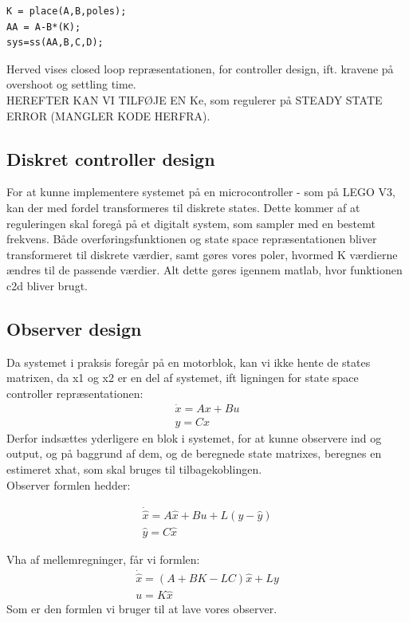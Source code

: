 \begin{lstlisting}
K = place(A,B,poles);
AA = A-B*(K);
sys=ss(AA,B,C,D);
\end{lstlisting}

Herved vises closed loop repræsentationen, for controller design, ift. kravene på overshoot og settling time.\\


HEREFTER KAN VI TILFØJE EN Ke, som regulerer på STEADY STATE ERROR (MANGLER KODE HERFRA). 

\subsection{Diskret controller design}
For at kunne implementere systemet på en microcontroller - som på LEGO V3, kan der med fordel transformeres til diskrete states. Dette kommer af at reguleringen skal foregå på et digitalt system, som sampler med en bestemt frekvens. 
Både overføringsfunktionen og state space repræsentationen bliver transformeret til diskrete værdier, samt gøres vores poler, hvormed K værdierne ændres til de passende værdier. Alt dette gøres igennem matlab, hvor funktionen c2d bliver brugt. 

\subsection{Observer design}
Da systemet i praksis foregår på en motorblok, kan vi ikke hente de states matrixen, da x1 og x2 er en del  af systemet, ift ligningen for state space controller repræsentationen: 
\begin{gather}
  \dot{x}=Ax+Bu \\
  y=Cx
\end{gather}
Derfor indsættes yderligere en blok i systemet, for at kunne observere ind og output, og på baggrund af dem, og de beregnede state matrixes, beregnes en estimeret xhat, som skal bruges til tilbagekoblingen. \\
Observer formlen hedder:


\begin{gather}
  \dot{\hat{x}}=A\hat{x}+Bu+L(y-\hat{y}) \\
  \hat{y}=C\hat{x}
\end{gather}

Vha af mellemregninger, får vi formlen: 
\begin{gather}
  \dot{\hat{x}}=(A+BK-LC)\hat{x}+Ly \\
  u=K\hat{x}
\end{gather}
Som er den formlen vi bruger til at lave vores observer.

 
